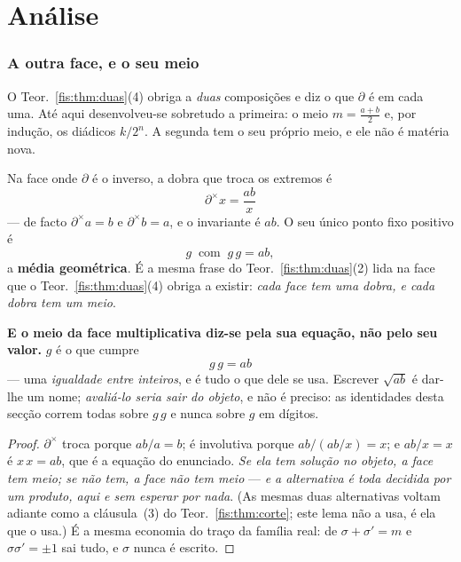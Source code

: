 \documentclass[livro.tex]{subfiles}
\begin{document}
\part{Análise}

\section{A outra face, e o seu meio}\label{fis:geo}

\noindent O Teor.~\ref{fis:thm:duas}(4) obriga a \emph{duas} composições e diz o
que $\partial$ é em cada uma. Até aqui desenvolveu-se sobretudo a primeira: o
meio $m=\tfrac{a+b}{2}$ e, por indução, os diádicos $k/2^{n}$. A segunda tem o
seu próprio meio, e ele não é matéria nova.

\begin{lema}\label{fis:lem:geo}
Na face onde $\partial$ é o inverso, a dobra que troca os extremos é
\[
\boxed{\;\partial^{\times}x=\frac{ab}{x}\;}
\]
--- de facto $\partial^{\times}a=b$ e $\partial^{\times}b=a$, e o invariante é
$ab$. O seu único ponto fixo positivo é
\[
g\ \text{ com }\ g\,g=ab,\]
a \textbf{média geométrica}. É a mesma frase do Teor.~\ref{fis:thm:duas}(2) lida
na face que o Teor.~\ref{fis:thm:duas}(4) obriga a existir: \emph{cada face tem
uma dobra, e cada dobra tem um meio}.

\medskip\noindent\textbf{E o meio da face multiplicativa diz-se pela sua
equação, não pelo seu valor.} $g$ é o que cumpre
\[
\boxed{\;g\,g=ab\;}
\]
--- uma \emph{igualdade entre inteiros}, e é tudo o que dele se usa. Escrever
$\sqrt{ab}$ é dar-lhe um nome; \emph{avaliá-lo seria sair do objeto}, e não é
preciso: as identidades desta secção correm todas sobre $g\,g$ e nunca sobre $g$
em dígitos.
\end{lema}

\begin{proof}
$\partial^{\times}$ troca porque $ab/a=b$; é involutiva porque $ab/(ab/x)=x$; e
$ab/x=x$ é $x\,x=ab$, que é a equação do enunciado. \emph{Se ela tem solução no
objeto, a face tem meio; se não tem, a face não tem meio} --- \emph{e a
alternativa é toda decidida por um produto, aqui e sem esperar por nada}. (As
mesmas duas alternativas voltam adiante como a cláusula~(3) do
Teor.~\ref{fis:thm:corte}; este lema não a usa, é ela que o usa.) É a mesma economia do traço da família real: de $\sigma+\sigma'=m$ e
$\sigma\sigma'=\pm1$ sai tudo, e $\sigma$ nunca é escrito.
\end{proof}
\end{document}
